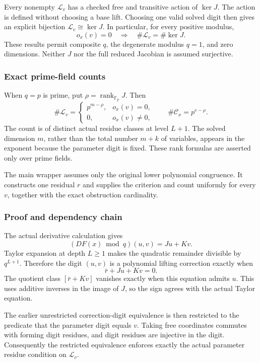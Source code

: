 Every nonempty \(\mathcal L_v\) has a checked free and transitive action
of \(\ker J\). The action is defined without choosing a base lift.
Choosing one valid solved digit then gives an explicit bijection
\(\mathcal L_v\cong\ker J\). In particular, for every positive modulus,
\[
o_x(v)=0\quad\Longrightarrow\quad\#\mathcal L_v=\#\ker J.
\] These results permit composite \(q\), the degenerate modulus \(q=1\),
and zero dimensions. Neither \(J\) nor the full reduced Jacobian is
assumed surjective.

\hypertarget{cont8:exact-prime-field-counts}{%
\subsubsection{Exact prime-field
counts}\label{cont8:exact-prime-field-counts}}

When \(q=p\) is prime, put \(\rho=\operatorname{rank}_{\mathbb F_p}J\).
Then \[
\boxed{\#\mathcal L_v=
\begin{cases}
p^{m-\rho},&o_x(v)=0,\\
0,&o_x(v)\ne0,
\end{cases}}
\qquad
\boxed{\#\mathcal C_x=p^{e-\rho}.}
\] The count is of distinct actual residue classes at level \(L+1\). The
solved dimension \(m\), rather than the total number \(m+k\) of
variables, appears in the exponent because the parameter digit is fixed.
These rank formulas are asserted only over prime fields.

The main wrapper assumes only the original lower polynomial congruence.
It constructs one residual \(r\) and supplies the criterion and count
uniformly for every \(v\), together with the exact obstruction
cardinality.

\hypertarget{cont8:proof-and-dependency-chain}{%
\subsubsection{Proof and dependency
chain}\label{cont8:proof-and-dependency-chain}}

The actual derivative calculation gives \[
(DF(x)\bmod q)(u,v)=Ju+Kv.
\] Taylor expansion at depth \(L\ge1\) makes the quadratic remainder
divisible by \(q^{L+1}\). Therefore the digit \((u,v)\) is a polynomial
lifting correction exactly when \[
\bar r+Ju+Kv=0.
\] The quotient class \([\bar r+Kv]\) vanishes exactly when this
equation admits \(u\). This uses additive inverses in the image of
\(J\), so the sign agrees with the actual Taylor equation.

The earlier unrestricted correction-digit equivalence is then restricted
to the predicate that the parameter digit equals \(v\). Taking free
coordinates commutes with forming digit residues, and digit residues are
injective in the digit. Consequently the restricted equivalence enforces
exactly the actual parameter residue condition on \(\mathcal L_v\).

